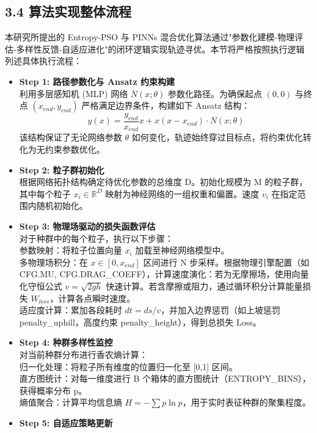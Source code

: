 \documentclass[twocolumn, 12pt]{article} %
\begin{document}
	\subsection{3.4 算法实现整体流程}
	本研究所提出的 Entropy-PSO 与 PINNs 混合优化算法通过"参数化建模-物理评估-多样性反馈-自适应进化"的闭环逻辑实现轨迹寻优。本节将严格按照执行逻辑列述具体执行流程：
	\begin{itemize}[leftmargin=*, itemsep=0pt, parsep=2pt, topsep=0pt]
		\item \textbf{Step 1: 路径参数化与 Ansatz 约束构建}\\
		利用多层感知机 (MLP) 网络 $N(x; \theta)$ 参数化路径。为确保起点 $(0,0)$ 与终点 $(x_{end}, y_{end})$ 严格满足边界条件，构建如下 Ansatz 结构：
		\begin{equation}
			y(x) = \frac{y_{end}}{x_{end}}x + x(x-x_{end}) \cdot N(x; \theta)
		\end{equation}
		该结构保证了无论网络参数 $\theta$ 如何变化，轨迹始终穿过目标点，将约束优化转化为无约束参数优化。
		\item \textbf{Step 2: 粒子群初始化}\\
		根据网络拓扑结构确定待优化参数的总维度 D。初始化规模为 M 的粒子群，其中每个粒子 $x_i \in \mathbb{R}^D$ 映射为神经网络的一组权重和偏置。速度 $v_i$ 在指定范围内随机初始化。
		\item \textbf{Step 3: 物理场驱动的损失函数评估}\\
		对于种群中的每个粒子，执行以下步骤：\\
		参数映射：将粒子位置向量 $x_i$ 加载至神经网络模型中。\\
		多物理场积分：在 $x \in [0, x_{end}]$ 区间进行 N 步采样。根据物理引擎配置（如 CFG.MU, CFG.DRAG\_COEFF），计算速度演化：若为无摩擦场，使用向量化守恒公式 $v=\sqrt{2gh}$ 快速计算。若含摩擦或阻力，通过循环积分计算能量损失 $W_{loss}$，计算各点瞬时速度。\\
		适应度计算：累加各段耗时 $dt = ds/v$，并加入边界惩罚（如上坡惩罚 penalty\_uphill，高度约束 penalty\_height），得到总损失 Loss。
		\item \textbf{Step 4: 种群多样性监控}\\
		对当前种群分布进行香农熵计算：\\
		归一化处理：将粒子所有维度的位置归一化至 [0,1] 区间。\\
		直方图统计：对每一维度进行 B 个箱体的直方图统计（ENTROPY\_BINS），获得概率分布 p。\\
		熵值聚合：计算平均信息熵 $H = -\sum p \ln p$，用于实时表征种群的聚集程度。
		\item \textbf{Step 5: 自适应策略更新}\\

\end{itemize}
\end{document}
